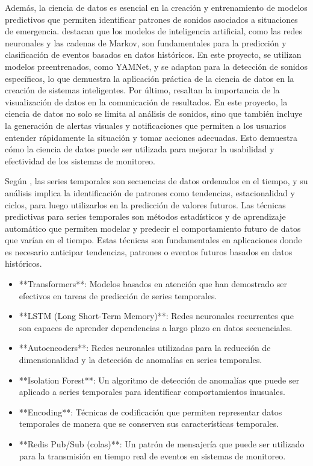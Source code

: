 Además, la ciencia de datos es esencial en la creación y entrenamiento de modelos predictivos que permiten identificar patrones de sonidos asociados a situaciones de emergencia. \citeauthor{russell_artificial_2022} \citeyear{russell_artificial_2022} destacan que los modelos de inteligencia artificial, como las redes neuronales y las cadenas de Markov, son fundamentales para la predicción y clasificación de eventos basados en datos históricos. En este proyecto, se utilizan modelos preentrenados, como YAMNet, y se adaptan para la detección de sonidos específicos, lo que demuestra la aplicación práctica de la ciencia de datos en la creación de sistemas inteligentes. Por último, \citeauthor{garcia_ciencia_2018} \citeyear{garcia_ciencia_2018} resaltan la importancia de la visualización de datos en la comunicación de resultados. En este proyecto, la ciencia de datos no solo se limita al análisis de sonidos, sino que también incluye la generación de alertas visuales y notificaciones que permiten a los usuarios entender rápidamente la situación y tomar acciones adecuadas. Esto demuestra cómo la ciencia de datos puede ser utilizada para mejorar la usabilidad y efectividad de los sistemas de monitoreo.


Según \citeauthor{hyndman_forecasting_2018} \citeyear{hyndman_forecasting_2018}, las series temporales son secuencias de datos ordenados en el tiempo, y su análisis implica la identificación de patrones como tendencias, estacionalidad y ciclos, para luego utilizarlos en la predicción de valores futuros. Las técnicas predictivas para series temporales son métodos estadísticos y de aprendizaje automático que permiten modelar y predecir el comportamiento futuro de datos que varían en el tiempo. Estas técnicas son fundamentales en aplicaciones donde es necesario anticipar tendencias, patrones o eventos futuros basados en datos históricos.

\begin{itemize}
    \item **Transformers**: Modelos basados en atención que han demostrado ser efectivos en tareas de predicción de series temporales.
    \item **LSTM (Long Short-Term Memory)**: Redes neuronales recurrentes que son capaces de aprender dependencias a largo plazo en datos secuenciales.
    \item **Autoencoders**: Redes neuronales utilizadas para la reducción de dimensionalidad y la detección de anomalías en series temporales.
    \item **Isolation Forest**: Un algoritmo de detección de anomalías que puede ser aplicado a series temporales para identificar comportamientos inusuales.
    \item **Encoding**: Técnicas de codificación que permiten representar datos temporales de manera que se conserven sus características temporales.
    \item **Redis Pub/Sub (colas)**: Un patrón de mensajería que puede ser utilizado para la transmisión en tiempo real de eventos en sistemas de monitoreo.
\end{itemize}
